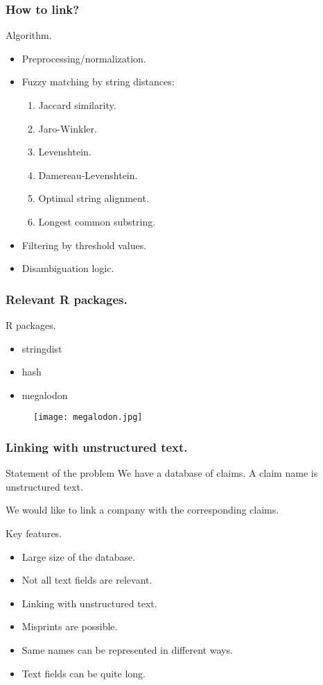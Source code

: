 \documentclass{beamer}
\begin{document}
\begin{frame}[fragile]
\frametitle{How to link?}
\begin{block}{Algorithm.}
\begin{itemize}
  \item Preprocessing/normalization.
	\item Fuzzy matching by string distances:
	
	\begin{enumerate}
		\item Jaccard similarity.
		\item Jaro-Winkler.
		\item Levenshtein.
		\item Damereau-Levenshtein.
		\item Optimal string alignment.
		\item Longest common substring.
	\end{enumerate}
	\item Filtering by threshold values.
	\item Disambiguation logic.
\end{itemize}
\end{block}
\end{frame}
\begin{frame}[fragile]
\frametitle{Relevant R packages.}
\begin{block}{R packages.}
\begin{itemize}
\item stringdist
\item hash
\item megalodon
\end{itemize}
\end{block}

\begin{figure}[h!]
\centering
\texttt{[image: megalodon.jpg]}
\end{figure}
\end{frame}
\begin{frame}
\frametitle{Linking with unstructured text.}
\begin{block}{Statement of the problem}
We have a database of claims. 
A claim name is unstructured text.

We would like to link a company with the corresponding claims.
\end{block}

\begin{block}{Key features.}
\begin{itemize}
\item Large size of the database.
\item Not all text fields are relevant.
\item Linking with unstructured text.
\item Misprints are possible.
\item Same names can be represented in different ways.
\item Text fields can be quite long.
\end{itemize}
\end{block}
\end{frame}
\end{document}
